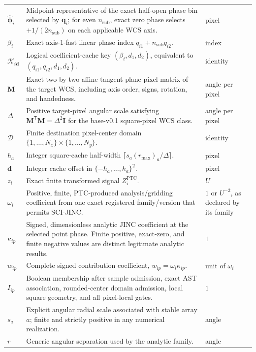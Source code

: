 \begin{longtable}{@{}>{\raggedright\arraybackslash}p{}
                        >{\raggedright\arraybackslash}p{}
                        >{\raggedright\arraybackslash}p{}@{}}
$\widehat{\boldsymbol{\phi}}_i$ & Midpoint representative of the exact
half-open phase bin selected by $\boldsymbol{q}_i$; for even
$n_{\mathrm{sub}}$, exact zero phase selects $+1/(2n_{\mathrm{sub}})$ on
each applicable WCS axis. & pixel \\
$\beta_i$ & Exact axis-1-fast linear phase index
$q_{i1}+n_{\mathrm{sub}}q_{i2}$. & index \\
$\mathcal{K}_{i\boldsymbol d}$ & Logical coefficient-cache key
$(\beta_i,d_1,d_2)$, equivalent to $(q_{i1},q_{i2},d_1,d_2)$. & identity \\
$\mathbf{M}$ & Exact two-by-two affine tangent-plane pixel matrix of the
target WCS, including axis order, signs, rotation, and handedness. &
angle per pixel \\
$\Delta$ & Positive target-pixel angular scale satisfying
$\mathbf{M}^{\mathsf T}\mathbf{M}=\Delta^2\mathbf{I}$ for the base-v0.1
square-pixel WCS class. & angle per pixel \\
$\mathcal{D}$ & Finite destination pixel-center domain
$\{1,\ldots,N_x\}\mathbin{\times}\{1,\ldots,N_y\}$. & identity \\
$h_a$ & Integer square-cache half-width
$\lceil s_a(r_{\max})_a/\Delta\rceil$. & pixel \\
$\boldsymbol{d}$ & Integer cache offset in
$\{-h_a,\ldots,h_a\}^2$. & pixel \\
$z_i$ & Exact finite transformed signal $Z_i^{\mathrm{PTC}}$. & $U$ \\
$\omega_i$ & Positive, finite, PTC-produced analysis/gridding coefficient
from one exact registered family/version that permits SCI-JINC. & $1$ or
$U^{-2}$, as declared by its family \\
$\kappa_{ip}$ & Signed, dimensionless analytic JINC coefficient at the
selected point phase.  Finite positive, exact-zero, and finite negative values
are distinct legitimate analytic results. & $1$ \\
$w_{ip}$ & Complete signed contribution coefficient,
$w_{ip}=\omega_i\kappa_{ip}$. & unit of $\omega_i$ \\
$I_{ip}$ & Boolean membership after sample admission, exact AST association,
rounded-center domain admission, local square geometry, and all pixel-local
gates. & $1$ \\
$s_a$ & Explicit angular radial scale associated with stable array $a$;
finite and strictly positive in any numerical realization. & angle \\
$r$ & Generic angular separation used by the analytic family. & angle \\

\end{longtable}
